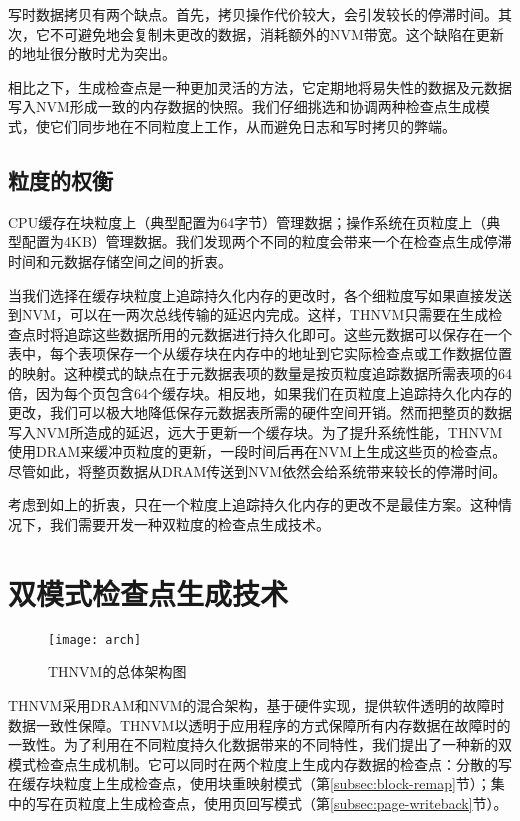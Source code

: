 写时数据拷贝有两个缺点。首先，拷贝操作代价较大，会引发较长的停滞时间。其次，它不可避免地会复制未更改的数据，消耗额外的NVM带宽。这个缺陷在更新的地址很分散时尤为突出。

相比之下，生成检查点是一种更加灵活的方法，它定期地将易失性的数据及元数据写入NVM形成一致的内存数据的快照。我们仔细挑选和协调两种检查点生成模式，使它们同步地在不同粒度上工作，从而避免日志和写时拷贝的弊端。

\subsection{粒度的权衡}

CPU缓存在块粒度上（典型配置为64字节）管理数据；操作系统在页粒度上（典型配置为4KB）管理数据。我们发现两个不同的粒度会带来一个在检查点生成停滞时间和元数据存储空间之间的折衷。

当我们选择在缓存块粒度上追踪持久化内存的更改时，各个细粒度写如果直接发送到NVM，可以在一两次总线传输的延迟内完成。这样，THNVM只需要在生成检查点时将追踪这些数据所用的元数据进行持久化即可。这些元数据可以保存在一个表中，每个表项保存一个从缓存块在内存中的地址到它实际检查点或工作数据位置的映射。这种模式的缺点在于元数据表项的数量是按页粒度追踪数据所需表项的64倍，因为每个页包含64个缓存块。相反地，如果我们在页粒度上追踪持久化内存的更改，我们可以极大地降低保存元数据表所需的硬件空间开销。然而把整页的数据写入NVM所造成的延迟，远大于更新一个缓存块。为了提升系统性能，THNVM使用DRAM来缓冲页粒度的更新，一段时间后再在NVM上生成这些页的检查点。尽管如此，将整页数据从DRAM传送到NVM依然会给系统带来较长的停滞时间。

考虑到如上的折衷，只在一个粒度上追踪持久化内存的更改不是最佳方案。这种情况下，我们需要开发一种双粒度的检查点生成技术。

\section{双模式检查点生成技术}

\begin{figure}[t]
\centering
\texttt{[image: arch]}
\caption{THNVM的总体架构图}
\label{fig-arch}
\end{figure}

THNVM采用DRAM和NVM的混合架构，基于硬件实现，提供软件透明的故障时数据一致性保障。THNVM以透明于应用程序的方式保障所有内存数据在故障时的一致性。为了利用在不同粒度持久化数据带来的不同特性，我们提出了一种新的双模式检查点生成机制。它可以同时在两个粒度上生成内存数据的检查点：分散的写在缓存块粒度上生成检查点，使用块重映射模式（第\ref{subsec:block-remap}节）；集中的写在页粒度上生成检查点，使用页回写模式（第\ref{subsec:page-writeback}节）。

